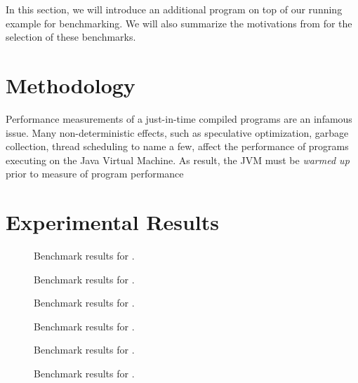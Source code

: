 In this section, we will introduce an additional program on top of our running example for benchmarking.
We will also summarize the motivations from \cite{scala:miniboxing} for the selection of these benchmarks.

\section{Methodology}

Performance measurements of a just-in-time compiled programs are an infamous issue\cite{java:performance-analysis}\cite{java:statistically-rigor-performance-analysis}.
Many non-deterministic effects, such as speculative optimization, garbage collection, thread scheduling to name a few, affect the performance of programs executing on the Java Virtual Machine.
As result, the JVM must be \textit{warmed up} prior to measure of program performance 
\section{Experimental Results}

\begin{figure}
	\centering
	
	\caption{Benchmark results for .}
\end{figure}

\begin{figure}
	\centering
	
	\caption{Benchmark results for .}
\end{figure}

\begin{figure}
	\centering
	
	\caption{Benchmark results for .}
\end{figure}

\begin{figure}
	\centering
	
	\caption{Benchmark results for .}
\end{figure}

\begin{figure}
	\centering
	
	\caption{Benchmark results for .}
\end{figure}

\begin{figure}
	\centering
	
	\caption{Benchmark results for .}
\end{figure}